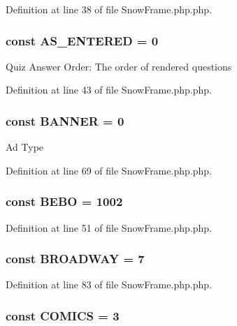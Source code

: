 Definition at line 38 of file SnowFrame.php.php.

\hypertarget{classSnowFrame_a57e74402ee3bb86f14263a0240e9fe4e}{
\subsubsection[{AS\_\-ENTERED}]{\setlength{\rightskip}{0pt plus 5cm}const {\bf AS\_\-ENTERED} = 0}}
\label{classSnowFrame_a57e74402ee3bb86f14263a0240e9fe4e}
Quiz Answer Order: The order of rendered questions 

Definition at line 43 of file SnowFrame.php.php.

\hypertarget{classSnowFrame_a18f4ddb3eef5b182fc8723b1dcbb8a0d}{
\subsubsection[{BANNER}]{\setlength{\rightskip}{0pt plus 5cm}const {\bf BANNER} = 0}}
\label{classSnowFrame_a18f4ddb3eef5b182fc8723b1dcbb8a0d}
Ad Type 

Definition at line 69 of file SnowFrame.php.php.

\hypertarget{classSnowFrame_a0853456a2889234ea148756b1767a233}{
\subsubsection[{BEBO}]{\setlength{\rightskip}{0pt plus 5cm}const {\bf BEBO} = 1002}}
\label{classSnowFrame_a0853456a2889234ea148756b1767a233}


Definition at line 51 of file SnowFrame.php.php.

\hypertarget{classSnowFrame_a030fa57e72ac5408f131217b16a0c321}{
\subsubsection[{BROADWAY}]{\setlength{\rightskip}{0pt plus 5cm}const {\bf BROADWAY} = 7}}
\label{classSnowFrame_a030fa57e72ac5408f131217b16a0c321}


Definition at line 83 of file SnowFrame.php.php.

\hypertarget{classSnowFrame_a4d9941e5c8b25e9686422a9660c8e7e2}{
\subsubsection[{COMICS}]{\setlength{\rightskip}{0pt plus 5cm}const {\bf COMICS} = 3}}
\label{classSnowFrame_a4d9941e5c8b25e9686422a9660c8e7e2}


